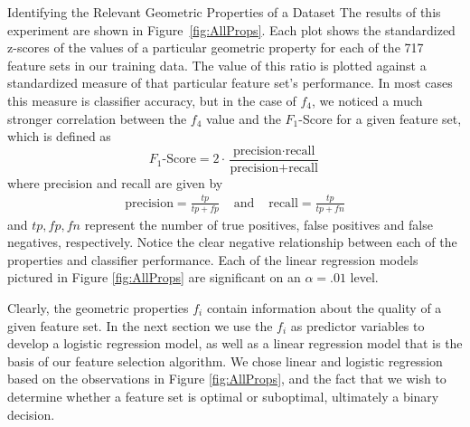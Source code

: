 \documentclass{llncs}
\begin{document}
\begin{section}{Identifying the Relevant Geometric Properties of a Dataset}
The results of this experiment are shown in Figure~\ref{fig:AllProps}. Each plot shows the standardized z-scores of the values of a particular geometric property for each of the 717 feature sets in our training data. The value of this ratio is plotted against a standardized measure of that particular feature set's performance. In most cases this measure is classifier accuracy, but in the case of $f_4$, we noticed a much stronger correlation between the $f_4$ value and the $F_1$-Score for a given feature set, which is defined as
$$\text{$F_1$-Score} = 2\cdot\frac{\text{precision}\cdot\text{recall}}{\text{precision}+\text{recall}}$$
where precision and recall are given by
\begin{eqnarray*}
\text{precision} = \frac{tp}{tp + fp} &\text{ and }&
\text{recall} = \frac{tp}{tp +fn}
\end{eqnarray*}
and $tp,fp,fn$ represent the number of true positives, false positives and false negatives, respectively.
Notice the clear negative relationship between each of the properties and classifier performance. Each of the linear regression models pictured in Figure \ref{fig:AllProps} are significant on an $\alpha = .01$ level. 

Clearly, the geometric properties $f_i$ contain information about the quality of a given feature set. In the next section we use the $f_i$ as predictor variables to develop a logistic regression model, as well as a linear regression model that is the basis of our feature selection algorithm. We chose linear and logistic regression based on the observations in Figure \ref{fig:AllProps}, and the fact that we wish to determine whether a feature set is optimal or suboptimal, ultimately a binary decision. 
\end{section}
\end{document}
